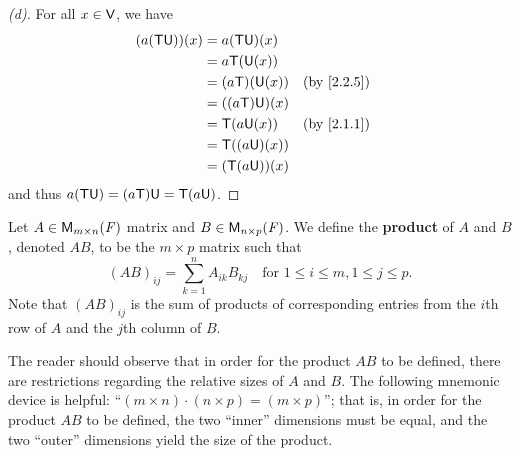 \begin{proof}[(d)]
	For all \(x \in \mathsf{V}\), we have
	\begin{align*}
		(a (\T \U))(x) & = a (\T \U)(x)                   \\
		               & = a \T(\U(x))                    \\
		               & = (a \T)(\U(x))  &  & \by{2.2.5} \\
		               & = ((a \T) \U)(x)                 \\
		               & = \T(a \U(x))    &  & \by{2.1.1} \\
		               & = \T((a \U)(x))                  \\
		               & = (\T (a \U))(x)
	\end{align*}
	and thus \(a (\mathsf{T} \mathsf{U}) = (a \mathsf{T}) \mathsf{U} = \mathsf{T} (a \mathsf{U})\).
\end{proof}

\begin{defn}\label{2.3.1}
	Let \(A \in \mathsf{M}_{{m} \times n}({\mathit{F}})\) matrix and \(B \in \mathsf{M}_{{n} \times p}({\mathit{F}})\).
	We define the \textbf{product} of \(A\) and \(B\), denoted \(AB\), to be the \(m \times p\) matrix such that
	\[
		(AB)_{i j} = \sum_{k = 1}^n A_{i k} B_{k j} \quad \text{for } 1 \leq i \leq m, 1 \leq j \leq p.
	\]
	Note that \((AB)_{i j}\) is the sum of products of corresponding entries from the \(i\)th row of \(A\) and the \(j\)th column of \(B\).
\end{defn}

\begin{note}
	The reader should observe that in order for the product \(AB\) to be defined, there are restrictions regarding the relative sizes of \(A\) and \(B\).
	The following mnemonic device is helpful:
	``\((m \times n) \cdot (n \times p) = (m \times p)\)'';
	that is, in order for the product \(AB\) to be defined, the two ``inner'' dimensions must be equal, and the two ``outer'' dimensions yield the size of the product.
\end{note}

